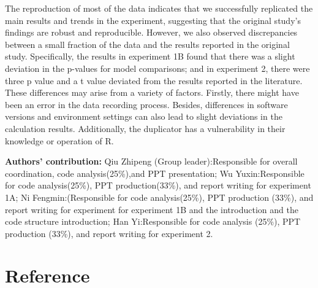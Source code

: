 \documentclass[
  man]{apa6}
\begin{document}
The reproduction of most of the data indicates that we successfully replicated the main results and trends in the experiment, suggesting that the original study's findings are robust and reproducible. However, we also observed discrepancies between a small fraction of the data and the results reported in the original study. Specifically, the results in experiment 1B found that there was a slight deviation in the p-values for model comparisons; and in experiment 2, there were three p value and a t value deviated from the results reported in the literature. These differences may arise from a variety of factors. Firstly, there might have been an error in the data recording process. Besides, differences in software versions and environment settings can also lead to slight deviations in the calculation results. Additionally, the duplicator has a vulnerability in their knowledge or operation of R.

\textbf{Authors' contribution:}
Qiu Zhipeng (Group leader):Responsible for overall coordination, code analysis(25\%),and PPT presentation;
Wu Yuxin:Responsible for code analysis(25\%), PPT production(33\%), and report writing for experiment 1A;
Ni Fengmin:(Responsible for code analysis(25\%), PPT production (33\%), and report writing for experiment for experiment 1B and the introduction and the code structure introduction;
Han Yi:Responsible for code analysis (25\%), PPT production (33\%), and report writing for experiment 2.

\hypertarget{reference}{%
\section*{Reference}\label{reference}}
\end{document}
